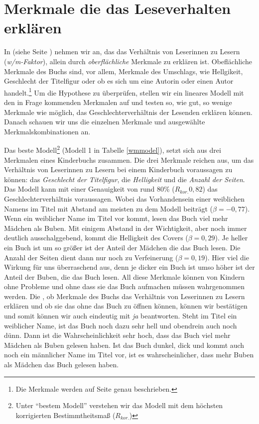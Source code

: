 \chapter{Merkmale die das Leseverhalten erklären}

In  (siehe Seite \pageref{h5}) nehmen wir an, das das
Verhältnis von Leserinnen zu Lesern (\emph{w/m-Faktor}), allein durch
\emph{oberflächliche} Merkmale zu erklären ist. Obeflächliche Merkmale
des Buchs sind, vor allem, Merkmale des Umschlags, wie Hellgikeit,
Geschlecht der Titelfigur oder ob es sich um eine Autorin oder einen
Autor
handelt.\footnote{Die Merkmale werden auf Seite \pageref{meth.merkmale} genau beschrieben.}
Um die Hypothese zu überprüfen, stellen wir ein lineares Modell mit den
in Frage kommenden Merkmalen auf und testen so, wie gut, so wenige
Merkmale wie möglich, das Geschlechterverhältnis der Lesenden erklären
können. Danach schauen wir uns die einzelnen Merkmale und ausgewählte
Merkmalskombinationen an.

Das beste
Modell\footnote{Unter \enquote{bestem Modell} verstehen wir das Modell mit dem höchsten korrigierten Bestimmtheitsmaß (\(R_{kor.}\))}
(Modell 1 in Tabelle \ref{wmmodel}), setzt sich aus drei Merkmalen eines
Kinderbuchs zusammen. Die drei Merkmale reichen aus, um das Verhältnis
von Leserinnen zu Lesern bei einem Kinderbuch voraussagen zu können: das
\emph{Geschlecht der Titelfigur}, die \emph{Helligkeit} und die
\emph{Anzahl der Seiten}. Das Modell kann mit einer Genauigkeit von rund
80\% ($R_{kor.}0{,}82$) das Geschlechterverhältnis voraussagen. Wobei
das Vorhandensein einer weiblichen Namens im Titel mit Abstand am
meisten zu dem Modell beiträgt ($\beta=-0{,}77$). Wenn ein weiblicher
Name im Titel vor kommt, lesen das Buch viel mehr Mädchen als Buben. Mit
einigem Abstand in der Wichtigkeit, aber noch immer deutlich
ausschalggebend, kommt die Helligkeit des Covers ($\beta=0{,}29$). Je
heller ein Buch ist um so größer ist der Anteil der Mädchen die das Buch
lesen. Die Anzahl der Seiten dient dann nur noch zu Verfeinerung
($\beta=0{,}19$). Hier viel die Wirkung für uns überraschend aus, denn
je dicker ein Buch ist umso höher ist der Anteil der Buben, die das Buch
lesen. All diese Merkmale können von Kindern ohne Probleme und ohne dass
sie das Buch aufmachen müssen wahrgenommen werden. Die , ob
Merkmale des Buchs das Verhältnis von Leserinnen zu Lesern erklären und
ob sie das ohne das Buch zu öffnen können, können wir bestätigen und
somit können wir auch  eindeutig mit \emph{ja}
beantworten. Steht im Titel ein weiblicher Name, ist das Buch noch dazu
sehr hell und obendrein auch noch dünn. Dann ist die Wahrscheinlichkeit
sehr hoch, dass das Buch viel mehr Mädchen als Buben gelesen haben. Ist
das Buch dunkel, dick und kommt auch noch ein männlicher Name im Titel
vor, ist es wahrscheinlicher, dass mehr Buben als Mädchen das Buch
gelesen haben.


